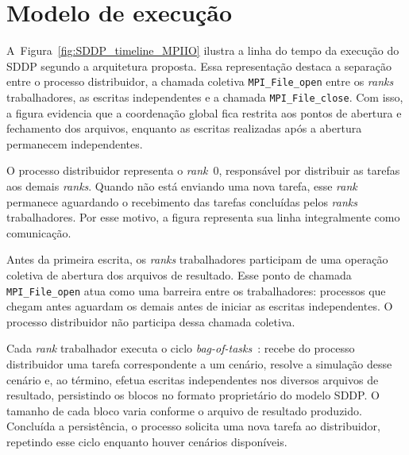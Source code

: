 \section{Modelo de execução}

A~Figura~\ref{fig:SDDP_timeline_MPIIO} ilustra a linha do tempo da
execução do SDDP segundo a arquitetura proposta. Essa representação
destaca a separação entre o processo distribuidor, a chamada coletiva
\texttt{MPI\_File\_open} entre os \textit{ranks} trabalhadores, as
escritas independentes e a chamada \texttt{MPI\_File\_close}. Com isso,
a figura evidencia que a coordenação global fica restrita aos pontos de
abertura e fechamento dos arquivos, enquanto as escritas realizadas após
a abertura permanecem independentes.

O processo distribuidor representa o \textit{rank}~0, responsável por
distribuir as tarefas aos demais \textit{ranks}. Quando não está enviando uma
nova tarefa, esse \textit{rank} permanece aguardando o
recebimento das tarefas concluídas pelos \textit{ranks} trabalhadores. Por
esse motivo, a figura representa sua linha integralmente como comunicação.

Antes da primeira escrita, os \textit{ranks} trabalhadores participam de
uma operação coletiva de abertura dos arquivos de resultado. Esse ponto
de chamada \texttt{MPI\_File\_open} atua como uma barreira entre os
trabalhadores: processos que chegam antes aguardam os demais antes de
iniciar as escritas independentes. O processo distribuidor não participa
dessa chamada coletiva.

Cada \textit{rank} trabalhador executa o ciclo
\textit{bag-of-tasks}~\cite{Cirne:2003}: recebe do processo distribuidor
uma tarefa correspondente a um cenário, resolve a simulação desse
cenário e, ao término, efetua escritas independentes nos diversos
arquivos de resultado, persistindo os blocos no formato proprietário do
modelo SDDP. O tamanho de cada bloco varia conforme o arquivo de
resultado produzido. Concluída a persistência, o processo solicita uma
nova tarefa ao distribuidor, repetindo esse ciclo enquanto houver
cenários disponíveis.


